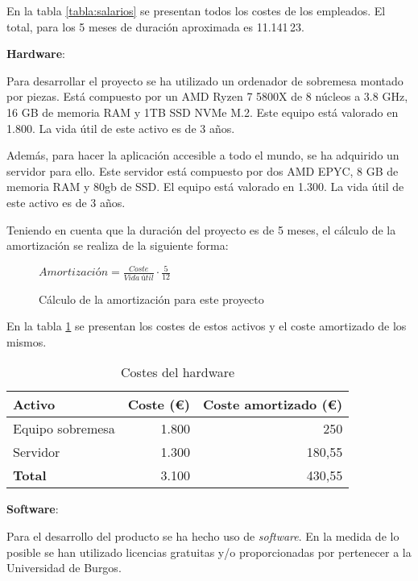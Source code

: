 En la tabla \ref{tabla:salarios} se presentan todos los costes de los empleados.
El total, para los 5 meses de duración aproximada es 11.141\,23\texteuro.

\textbf{Hardware}:

Para desarrollar el proyecto se ha utilizado un ordenador de sobremesa montado
por piezas. Está compuesto por un AMD Ryzen 7 5800X de 8 núcleos a 3.8 GHz, 16
GB de memoria RAM y 1TB SSD NVMe M.2. Este equipo está valorado en
1.800\texteuro. La vida útil de este activo es de 3 años.

Además, para hacer la aplicación accesible a todo el mundo, se ha adquirido un
servidor para ello. Este servidor está compuesto por dos AMD EPYC, 8 GB de
memoria RAM y 80gb de SSD. El equipo está valorado en 1.300\texteuro. La vida
útil de este activo es de 3 años.

Teniendo en cuenta que la duración del proyecto es de 5 meses, el cálculo de la
amortización se realiza de la siguiente forma:

\begin{figure}[H]
\begin{center}
$Amortización = \frac{Coste}{Vida~útil} \cdot \frac{5}{12}$
\end{center}
\caption{Cálculo de la amortización para este proyecto}
\end{figure}


En la tabla \ref{tabla:hardware} se presentan los costes de estos activos y el
coste amortizado de los mismos.

\begin{table}[H]
    \centering
\begin{tabular}{lrr}
\toprule
\textbf{Activo}      & \textbf{Coste (€)}      & \textbf{Coste amortizado (€)}      \\ \midrule
Equipo sobremesa     & 1.800                    & 250                      \\
Servidor             & 1.300                    & 180,55                      \\ \midrule
\textbf{Total}       & 3.100                    & 430,55                      \\ \midrule
\end{tabular}
\caption{Costes del hardware}
\label{tabla:hardware}
\end{table}


\textbf{Software}:

Para el desarrollo del producto se ha hecho uso de \textit{software}. En la
medida de lo posible se han utilizado licencias gratuitas y/o proporcionadas por
pertenecer a la Universidad de Burgos.

